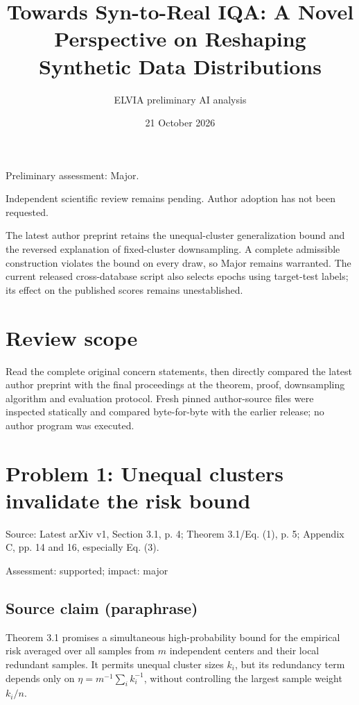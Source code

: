 \documentclass[11pt]{article}
\begin{document}
\title{Towards Syn-to-Real IQA: A Novel Perspective on Reshaping Synthetic Data Distributions}

\author{ELVIA preliminary AI analysis}\date{21 October 2026}\maketitle

Preliminary assessment: Major.\par

Independent scientific review remains pending. Author adoption has not been requested.

The latest author preprint retains the unequal-cluster generalization bound and the reversed explanation of fixed-cluster downsampling. A complete admissible construction violates the bound on every draw, so Major remains warranted. The current released cross-database script also selects epochs using target-test labels; its effect on the published scores remains unestablished.

\section*{Review scope}

Read the complete original concern statements, then directly compared the latest author preprint with the final proceedings at the theorem, proof, downsampling algorithm and evaluation protocol. Fresh pinned author-source files were inspected statically and compared byte-for-byte with the earlier release; no author program was executed.

\section*{Problem 1: Unequal clusters invalidate the risk bound}

Source: Latest arXiv v1, Section 3.1, p. 4; Theorem 3.1/Eq. (1), p. 5; Appendix C, pp. 14 and 16, especially Eq. (3).

Assessment: supported; impact: major

\subsection*{Source claim (paraphrase)}

Theorem 3.1 promises a simultaneous high-probability bound for the empirical risk averaged over all samples from \(m\) independent centers and their local redundant samples. It permits unequal cluster sizes \(k_i\), but its redundancy term depends only on \(\eta=m^{-1}\sum_i k_i^{-1}\), without controlling the largest sample weight \(k_i/n\).
\end{document}
